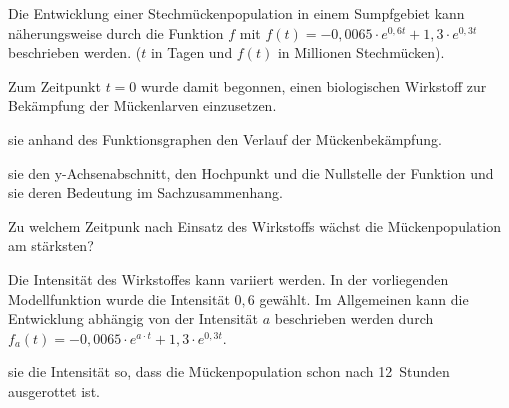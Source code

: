 \documentclass[11pt, a5paper, landscape, final]{scrartcl}
\begin{document}
	\begin{aufgabe}
		Die Entwicklung einer Stechmückenpopulation in einem Sumpfgebiet kann näherungsweise durch die Funktion $f$ mit $f(t) = -0,0065\cdot e^{0,6t} + 1,3\cdot e^{0,3t}$ beschrieben werden. ($t$ in Tagen und $f(t)$ in Millionen Stechmücken).
		
		Zum Zeitpunkt $t = 0$ wurde damit begonnen, einen biologischen Wirkstoff zur Bekämpfung der Mückenlarven einzusetzen.
		\begin{enumeratea}
			\item {} sie anhand des Funktionsgraphen den Verlauf der Mückenbekämpfung.
			
			 sie den y-Achsenabschnitt, den Hochpunkt und die Nullstelle der Funktion und  sie deren Bedeutung im Sachzusammenhang.
			
			\item Zu welchem Zeitpunk nach Einsatz des Wirkstoffs wächst die Mückenpopulation am stärksten?
			
			\item Die Intensität des Wirkstoffes kann variiert werden. In der vorliegenden Modellfunktion wurde die Intensität $0,6$ gewählt. Im Allgemeinen kann die Entwicklung abhängig von der Intensität $a$ beschrieben werden durch $f_a(t) = -0,0065\cdot e^{a\cdot t} + 1,3\cdot e^{0,3t}$.
			
			 sie die Intensität so, dass die Mückenpopulation schon nach \SI{12}{Stunden} ausgerottet ist.
		\end{enumeratea}
	\end{aufgabe}
	\clearpage
	
\end{document}
